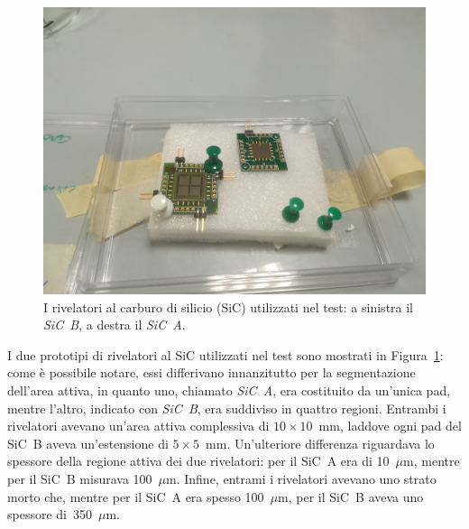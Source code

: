 \begin{figure} [!t]
	\centering
	\includegraphics[width=\textwidth, keepaspectratio]{Grafici/sic.jpg}
	\caption{I rivelatori al carburo di silicio (SiC) utilizzati nel test: a sinistra il \emph{SiC~B}, a destra il \emph{SiC~A}.} \label{fig:sic}
\end{figure}



I due prototipi di rivelatori al SiC utilizzati nel test sono mostrati in Figura~\ref{fig:sic}: come è possibile notare, essi differivano innanzitutto per la segmentazione dell'area attiva, in quanto uno, chiamato \emph{SiC~A}, era costituito da un'unica pad, mentre l'altro, indicato con \emph{SiC~B}, era suddiviso in quattro regioni. 
Entrambi i rivelatori avevano un'area attiva complessiva di $10 \times 10$~mm, laddove ogni pad del SiC~B aveva un'estensione di $5 \times 5$~mm.
Un'ulteriore differenza riguardava lo spessore della regione attiva dei due rivelatori: per il SiC~A era di 10~$\mu$m, mentre per il SiC~B misurava 100~$\mu$m.
Infine, entrami i rivelatori avevano uno strato morto che, mentre per il SiC~A era spesso 100~$\mu$m, per il SiC~B aveva uno spessore di~350~$\mu$m.


